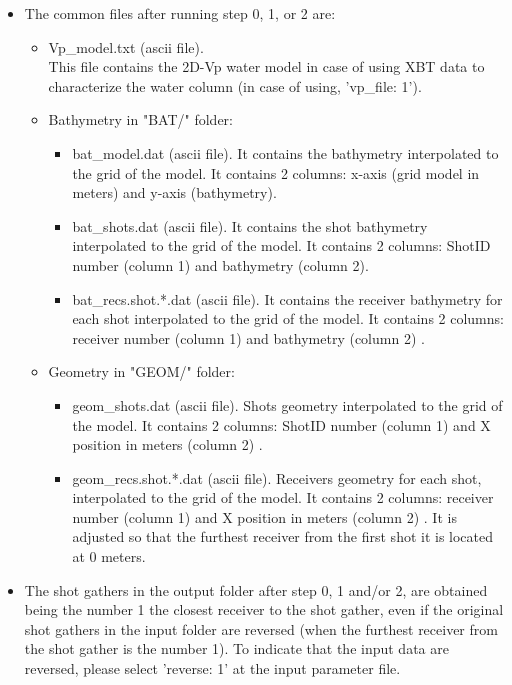 \documentclass[11pt, oneside]{article}   	%
\begin{document}
\begin{itemize}
\begin{itemize}
\end{itemize}

\item The common files after running step 0, 1, or 2 are:

 \begin{itemize}

 \item Vp\_model.txt (ascii file).\\
 This file contains the 2D-Vp water model in case of using XBT data to characterize the water column (in case of using, 'vp\_file: 1').
  \item Bathymetry in "BAT/" folder:
 \begin{itemize}
 \item   bat\_model.dat (ascii file). It contains the bathymetry interpolated to the grid of the model. It contains 2 columns: x-axis (grid model in meters) and y-axis (bathymetry).
 \item bat\_shots.dat (ascii file). It contains the shot bathymetry interpolated to the grid of the model. It contains 2 columns: ShotID number (column 1) and bathymetry (column 2).
 \item bat\_recs.shot.*.dat (ascii file). It contains the receiver bathymetry for each shot interpolated to the grid of the model. It contains 2 columns: receiver number (column 1) and bathymetry (column 2) .
\end{itemize}

 \item Geometry in "GEOM/" folder:
  \begin{itemize}
  \item  geom\_shots.dat (ascii file). Shots geometry interpolated to the grid of the model. It contains 2 columns: ShotID number (column 1) and X position in meters (column 2) .
  \item  geom\_recs.shot.*.dat (ascii file). Receivers geometry for each shot, interpolated to the grid of the model. It contains 2 columns: receiver number (column 1) and X position in meters (column 2) . It is adjusted so that the furthest receiver from the first shot it is located at 0 meters.

   \end{itemize}
   \end{itemize}
   

\item The shot gathers in the output folder after step 0, 1 and/or 2, are obtained being the number 1 the closest receiver to the shot gather, even if the original shot gathers in the input folder are reversed (when the furthest receiver from the shot gather is the number 1). To indicate that the input data are reversed, please select 'reverse: 1' at the input parameter file.

\end{itemize}
\end{document}
